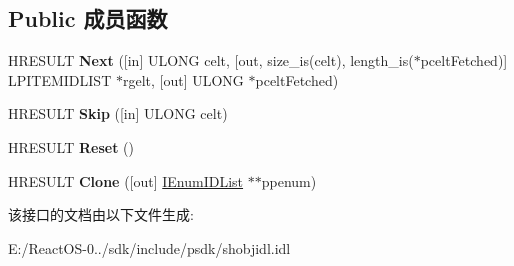 \subsection*{Public 成员函数}
\begin{DoxyCompactItemize}
\item 
\mbox{\label{interface_i_enum_i_d_list_a0e89cb9b91a228865b491a9e3e7f3dbb}} 
H\+R\+E\+S\+U\+LT {\bfseries Next} (\mbox{[}in\mbox{]} U\+L\+O\+NG celt, \mbox{[}out, size\+\_\+is(celt), length\+\_\+is($\ast$pcelt\+Fetched)\mbox{]} L\+P\+I\+T\+E\+M\+I\+D\+L\+I\+ST $\ast$rgelt, \mbox{[}out\mbox{]} U\+L\+O\+NG $\ast$pcelt\+Fetched)
\item 
\mbox{\label{interface_i_enum_i_d_list_a3840054e844220d5e12ef5e66da565b7}} 
H\+R\+E\+S\+U\+LT {\bfseries Skip} (\mbox{[}in\mbox{]} U\+L\+O\+NG celt)
\item 
\mbox{\label{interface_i_enum_i_d_list_aee3fc6d3b1b9e093def82a27621c041b}} 
H\+R\+E\+S\+U\+LT {\bfseries Reset} ()
\item 
\mbox{\label{interface_i_enum_i_d_list_a3e6583a4e574010a6f6b2f85df9b41f1}} 
H\+R\+E\+S\+U\+LT {\bfseries Clone} (\mbox{[}out\mbox{]} \hyperlink{interface_i_enum_i_d_list}{I\+Enum\+I\+D\+List} $\ast$$\ast$ppenum)
\end{DoxyCompactItemize}


该接口的文档由以下文件生成\+:\begin{DoxyCompactItemize}
\item 
E\+:/\+React\+O\+S-\/0../sdk/include/psdk/shobjidl.\+idl\end{DoxyCompactItemize}
